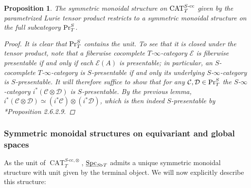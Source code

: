 \documentclass[reqno]{memo-l}
\theoremstyle{mythm}
\newtheorem{prop}[thm]{Proposition}
\theoremstyle{definition}
\numberwithin{equation}{section}
\newcommand{\Cc}{{\mathcal{C}}}
\newcommand{\Dd}{{\mathcal{D}}}
\newcommand{\Ee}{{\mathcal{E}}}
\DeclareMathOperator{\Spc}{Spc}
\DeclareMathOperator{\CAT}{CAT}
\renewcommand{\Pr}{\textup{Pr}}
\newcommand{\ulhelper}[2]{\underline{\setbox0=\hbox{$#1#2$}\dp0=0.4pt \box0\relax}}
\newcommand{\ul}[1]{{\mathpalette\ulhelper{#1}}\hbox{\rule[-2pt]{0pt}{0pt}}}
\begin{document}
\begin{prop}
    The symmetric monoidal structure on $\CAT_T^\textup{$S$-cc}$ given by the parametrized Lurie tensor product restricts to a symmetric monoidal structure on the full subcategory $\Pr^S_T$.
    \begin{proof}
        It is clear that $\Pr^S_T$ contains the unit. To see that it is closed under the tensor product, note that a fiberwise cocomplete $T$-$\infty$-category $\Ee$ is fiberwise presentable if and only if each $\Ee(A)$ is presentable; in particular, an $S$-cocomplete $T$-$\infty$-category is $S$-presentable if and only its underlying $S$-$\infty$-category is $S$-presentable. It will therefore suffice to show that for any $\Cc,\Dd\in\Pr^S_T$ the $S$-$\infty$-category $i^*(\Cc\otimes\Dd)$ is $S$-presentable. By the previous lemma, $i^*(\Cc\otimes\Dd)\simeq (i^*\Cc)\otimes (i^*\Dd)$, which is then indeed $S$-presentable by \cite{martiniwolf2022presentable}*{Proposition 2.6.2.9}.
    \end{proof}
\end{prop}

\subsubsection{Symmetric monoidal structures on equivariant and global spaces} As the unit of $\CAT_T^{\text{$S$-cc},\otimes}$, $\ul\Spc_{S\triangleright T}$ admits a unique symmetric monoidal structure with unit given by the terminal object. We will now explicitly describe this structure:
\end{document}
